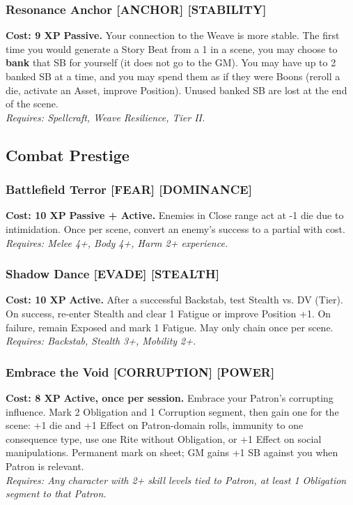 \subsubsection*{Resonance Anchor \textnormal{[ANCHOR] [STABILITY]}}
\label{talent:resonance-anchor}
\textbf{Cost: 9 XP} \textbf{Passive.} Your connection to the Weave is more stable. The first time you would generate a Story Beat from a 1 in a scene, you may choose to \textbf{bank} that SB for yourself (it does not go to the GM). You may have up to 2 banked SB at a time, and you may spend them as if they were Boons (reroll a die, activate an Asset, improve Position). Unused banked SB are lost at the end of the scene. \\
\textit{Requires: Spellcraft, Weave Resilience, Tier II.}

\subsection*{Combat Prestige}
\label{sec:prestige-combat}

\subsubsection*{Battlefield Terror \textnormal{[FEAR] [DOMINANCE]}}
\label{talent:battlefield-terror}
\textbf{Cost: 10 XP} \textbf{Passive + Active.} Enemies in Close range act at -1 die due to intimidation. Once per scene, convert an enemy's success to a partial with cost. \\
\textit{Requires: Melee 4+, Body 4+, Harm 2+ experience.}

\subsubsection*{Shadow Dance \textnormal{[EVADE] [STEALTH]}}
\label{talent:shadow-dance}
\textbf{Cost: 10 XP} \textbf{Active.} After a successful Backstab, test Stealth vs. DV (Tier). On success, re-enter Stealth and clear 1 Fatigue or improve Position +1. On failure, remain Exposed and mark 1 Fatigue. May only chain once per scene. \\
\textit{Requires: Backstab, Stealth 3+, Mobility 2+.}

\subsubsection*{Embrace the Void \textnormal{[CORRUPTION] [POWER]}}
\label{talent:embrace-the-void}
\textbf{Cost: 8 XP} \textbf{Active, once per session.} Embrace your Patron's corrupting influence. Mark 2 Obligation and 1 Corruption segment, then gain one for the scene: +1 die and +1 Effect on Patron-domain rolls, immunity to one consequence type, use one Rite without Obligation, or +1 Effect on social manipulations. Permanent mark on sheet; GM gains +1 SB against you when Patron is relevant. \\
\textit{Requires: Any character with 2+ skill levels tied to Patron, at least 1 Obligation segment to that Patron.}

